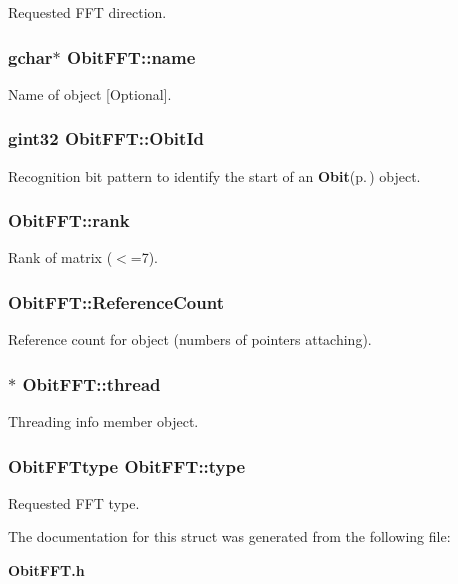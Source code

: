 Requested FFT direction. 

\subsubsection{\setlength{\rightskip}{0pt plus 5cm}gchar$\ast$ {\bf Obit\-FFT::name}}\label{structObitFFT_o3}


Name of object [Optional]. 

\subsubsection{\setlength{\rightskip}{0pt plus 5cm}gint32 {\bf Obit\-FFT::Obit\-Id}}\label{structObitFFT_o0}


Recognition bit pattern to identify the start of an {\bf Obit}{\rm (p.\,\pageref{structObit})} object. 

\subsubsection{ {\bf Obit\-FFT::rank}}\label{structObitFFT_o7}


Rank of matrix ($<$=7). 

\subsubsection{ {\bf Obit\-FFT::Reference\-Count}}\label{structObitFFT_o2}


Reference count for object (numbers of pointers attaching). 

\subsubsection{$\ast$ {\bf Obit\-FFT::thread}}\label{structObitFFT_o4}


Threading info member object. 

\subsubsection{\setlength{\rightskip}{0pt plus 5cm}Obit\-FFTtype {\bf Obit\-FFT::type}}\label{structObitFFT_o6}


Requested FFT type. 



The documentation for this struct was generated from the following file:\begin{CompactItemize}
\item 
{\bf Obit\-FFT.h}\end{CompactItemize}
